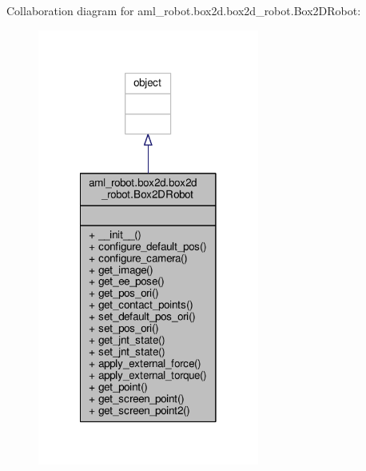 Collaboration diagram for aml\-\_\-robot.\-box2d.\-box2d\-\_\-robot.\-Box2\-D\-Robot\-:
\nopagebreak
\begin{figure}[H]
\begin{center}
\leavevmode
\includegraphics[width=206pt]{classaml__robot_1_1box2d_1_1box2d__robot_1_1_box2_d_robot__coll__graph}
\end{center}
\end{figure}
